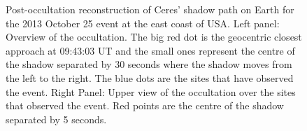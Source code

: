 \documentclass[useAMS,usenatbib]{mn2e}
\begin{document}
\begin{figure}
\begin{centering}
\hspace{5mm}
\caption{Post-occultation reconstruction of Ceres' shadow path on Earth for the 2013 October 25 event at the east coast of USA. Left panel: Overview of the occultation. The big red dot is the geocentric closest approach at 09:43:03 UT and the small ones represent the centre of the shadow separated by 30 seconds where the shadow moves from the left to the right. The blue dots are the sites that have observed the event. Right Panel: Upper view of the occultation over the sites that observed the event. Red points are the centre of the shadow separated by 5 seconds. \label{Fig: Ceres-2013-map}}
\end{centering}
\end{figure}
\end{document}
